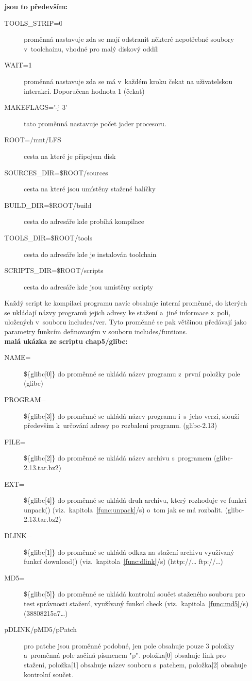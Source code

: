 \documentclass[a4paper,12pt]{article}
\newcommand{\odkazNaKapitolu}[1]{(viz.~kapitola~\ref{#1}/s\pageref{#1})}
\renewcommand{\b}[1]{\textbf{#1}} %
\begin{document}
\b{jsou to především:}
\begin{description}
 \item[TOOLS\_STRIP=0] proměnná nastavuje zda se mají odstranit některé nepotřebné soubory v~toolchainu, vhodné pro malý diskový oddíl
 \item[WAIT=1] proměnná nastavuje zda se má v~každém kroku čekat na uživatelskou interakci. Doporučena hodnota 1 (čekat)
 \item[MAKEFLAGS='-j 3'] tato proměnná nastavuje počet jader procesoru.
 \item[ROOT=/mnt/LFS] cesta na které je připojem disk
 \item[SOURCES\_DIR=\$ROOT/sources] cesta na které jsou umístěny stažené balíčky
 \item[BUILD\_DIR=\$ROOT/build] cesta do adresáře kde probíhá kompilace
 \item[TOOLS\_DIR=\$ROOT/tools] cesta do adresáře kde je instalován toolchain
 \item[SCRIPTS\_DIR=\$ROOT/scripts] cesta do adresáře kde jsou umístěny scripty
 \end{description}

Každý script ke kompilaci programu navíc obsahuje interní proměnné, do kterých se ukládají názvy programů jejich adresy ke stažení a~jiné informace z~polí, uložených v~souboru includes/ver. Tyto proměnné se pak většinou předávají jako parametry funkcím definovaným v souboru includes/funtions.\\

\b{malá ukázka ze scriptu chap5/glibc:}
\begin{description}
 \item[NAME=]\$\{glibc[0]\} do proměnné se ukládá název programu z~první položky pole (glibc)
 \item[PROGRAM=]\$\{glibc[3]\} do proměnné se ukládá název programu i~s~jeho verzí, slouží především k~určování adresy po rozbalení programu. (glibc-2.13)
 \item[FILE=]\$\{glibc[2]\} do proměnné se ukládá název archivu s~programem (glibc-2.13.tar.bz2)
 \item[EXT=]\$\{glibc[4]\} do proměnné se ukládá druh archivu, který rozhoduje ve funkci unpack() \odkazNaKapitolu{func:unpack} o~tom jak se má rozbalit. (glibc-2.13.tar.bz2)
 \item[DLINK=]\$\{glibc[1]\} do proměnné se ukládá odkaz na stažení archivu využívaný funkcí download() \odkazNaKapitolu{func:dlink} (http://… ftp://…)
 \item[MD5=]\$\{glibc[5]\} do proměnné se ukládá kontrolní součet staženého souboru pro test správnosti stažení, využívaný funkcí check \odkazNaKapitolu{func:md5} (38808215a7…)
 \item[pDLINK/pMD5/pPatch] pro patche jsou proměnné podobné, jen pole obsahuje pouze 3 položky a~proměnná pole začíná písmenem "p". položka[0] obsahuje link pro stažení, položka[1] obsahuje název souboru s~patchem, položka[2] obsahuje kontrolní součet.
 \end{description}
\end{document}
